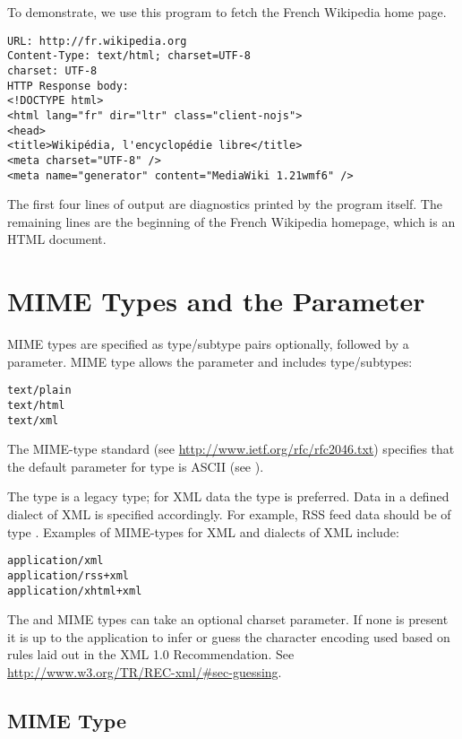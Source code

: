 To demonstrate, we use this program to fetch the French Wikipedia home page.
\begin{verbatim}  
URL: http://fr.wikipedia.org
Content-Type: text/html; charset=UTF-8
charset: UTF-8
HTTP Response body:
<!DOCTYPE html>
<html lang="fr" dir="ltr" class="client-nojs">
<head>
<title>Wikipédia, l'encyclopédie libre</title>
<meta charset="UTF-8" />
<meta name="generator" content="MediaWiki 1.21wmf6" />
\end{verbatim}
The first four lines of output are diagnostics printed by the  program itself.
The remaining lines are the beginning of the French Wikipedia homepage,
which is an HTML document.


\section{MIME Types and the   Parameter}

MIME types are specified as type/subtype pairs optionally, followed by a parameter. 
MIME type  allows the  parameter and includes type/subtypes:
\begin{verbatim} 
text/plain 
text/html
text/xml
\end{verbatim}
The MIME-type standard (see \url{http://www.ietf.org/rfc/rfc2046.txt}) specifies
that the default  parameter for type  is ASCII (see ).

The type  is a legacy type; for XML data the type 
 is preferred. 
Data in a defined dialect of XML is specified accordingly.
For example, RSS feed data should be of type .
Examples of MIME-types for XML and dialects of XML include:
\begin{verbatim}  
application/xml
application/rss+xml 
application/xhtml+xml 
\end{verbatim}  
The  and  MIME types can take an
optional charset parameter.  If none is present it is up to the application
to infer or guess the character encoding used based on rules laid out
in the XML 1.0 Recommendation.  See \url{http://www.w3.org/TR/REC-xml/#sec-guessing}.

\subsection{MIME Type }\label{section:urlencoding}

